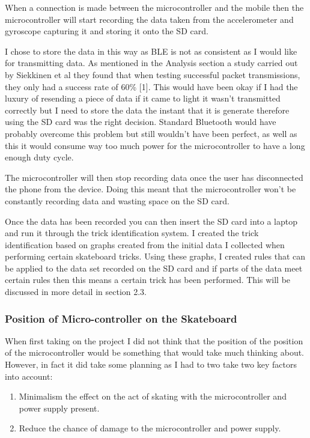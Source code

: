 When a connection is made between the microcontroller and the mobile then the microcontroller will start recording the data taken from the accelerometer and gyroscope capturing it and storing it onto the SD card. 

I chose to store the data in this way as BLE is not as consistent as I would like for transmitting data. As mentioned in the Analysis section a study carried out by Siekkinen et al they found that when testing successful packet transmissions, they only had a success rate of 60\% [1]. This would have been okay if I had the luxury of resending a piece of data if it came to light it wasn’t transmitted correctly but I need to store the data the instant that it is generate therefore using the SD card was the right decision. Standard Bluetooth would have probably overcome this problem but still wouldn’t have been perfect, as well as this it would consume way too much power for the microcontroller to have a long enough duty cycle.

The microcontroller will then stop recording data once the user has disconnected the phone from the device. Doing this meant that the microcontroller won’t be constantly recording data and wasting space on the SD card.

Once the data has been recorded you can then insert the SD card into a laptop and run it through the trick identification system. I created the trick identification based on graphs created from the initial data I collected when performing certain skateboard tricks. Using these graphs, I created rules that can be applied to the data set recorded on the SD card and if parts of the data meet certain rules then this means a certain trick has been performed. This will be discussed in more detail in section 2.3.


\subsubsection{Position of Micro-controller on the Skateboard}\label{mcposition}

When first taking on the project I did not think that the position of the position of the microcontroller would be something that would take much thinking about. However, in fact it did take some planning as I had to two take two key factors into account:

\begin{enumerate}
\item Minimalism the effect on the act of skating with the microcontroller and power supply present.
\item Reduce the chance of damage to the microcontroller and power supply.
\end{enumerate}

